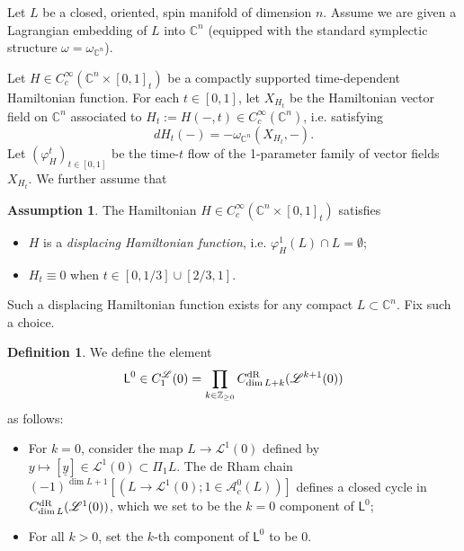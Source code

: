 \documentclass[10pt]{amsart}
\numberwithin{equation}{section}
\theoremstyle{plain}
\theoremstyle{definition}
\newtheorem{definition}[theorem]{Definition}
\newtheorem{assumption}[theorem]{Assumption}
\theoremstyle{remark}
\numberwithin{equation}{section}
\newcommand{\Z}{\mathbb{Z}}
\newcommand{\C}{\mathbb{C}}
\newcommand{\dR}{\textup{dR}}
\newcommand{\Cfr}[1]{C_{#1}^\mathscr{L}}
\newcommand{\LL}{\textsf{L}}
\begin{document}
{Let $L$ be a closed, oriented, spin manifold of dimension $n$.
Assume we are given a Lagrangian embedding of $L$ into $\C^n$ (equipped with the standard symplectic structure $\omega=\omega_{\C^n}$).


Let $H\in C_c^\infty(\C^n\times [0,1]_t)$ be a compactly supported time-dependent Hamiltonian function. 
For each $t\in [0,1]$, let $X_{H_t}$ be the Hamiltonian vector field on $\C^n$ associated to $H_t:=H(-,t)\in C_c^\infty(\C^n)$, i.e. satisfying \[
	dH_t(-) = -\omega_{\C^n}(X_{H_t},-).
\] 
Let $(\varphi_H^t)_{t\in[0,1]}$ be the time-$t$ flow of the 1-parameter family of vector fields $X_{H_t}$.
We further assume that 
\begin{assumption}\label{Asmp: Disp Hamil}The Hamiltonian $H\in C_c^\infty(\C^n\times [0,1]_t)$ satisfies
	\begin{itemize}
	\item $H$ is a \emph{displacing Hamiltonian function}, i.e. $\varphi^1_H(L) \cap L = \emptyset$;
	\item $H_t\equiv 0 $ when $t\in [0,1/3]\cup [2/3,1]$. 
\end{itemize}
\end{assumption}
Such a displacing Hamiltonian function exists for any compact $L\subset \C^n$. Fix such a choice. 





\begin{definition}\label{Defn: LL^0}
We define the element \[
	\LL^0\in \Cfr{1}(0) = \prod_{k\in \Z_{\geq 0}} C^\dR_{\dim L + k} (\mathscr{L}^{k+1}(0))\]
 as follows: 
 \begin{itemize}
 	\item For $k=0$,  consider the map $L\to \mathscr{L}^1(0)$ defined by $y\mapsto [\underline{y}]\in \mathscr{L}^1(0)\subset \Pi_1 L$. The de Rham chain $(-1)^{\dim L + 1}[(L\to \mathscr{L}^1(0); 1\in \mathscr{A}_c^0(L))]$ defines a closed cycle in $C^\dR_{\dim L}(\mathscr{L}^1(0))$, which we set to be the $k=0$ component of $\LL^0$;
 	\item For all $k> 0$, set the $k$-th component of $\LL^0$ to be 0.
  \end{itemize}
\end{definition}


}
\end{document}
